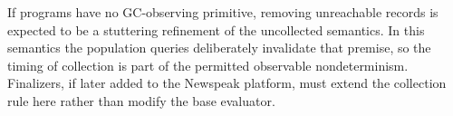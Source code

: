 If programs have no GC-observing primitive, removing unreachable records is
expected to be a stuttering refinement of the uncollected semantics.  In this
semantics the population queries deliberately invalidate that premise, so the
timing of collection is part of the permitted observable nondeterminism.
Finalizers, if later added to the Newspeak platform, must extend the collection
rule here rather than modify the base evaluator.
